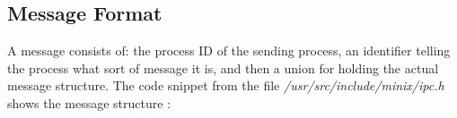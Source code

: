 \subsection{Message Format}

A message consists of: the process ID of the sending process, an identifier telling the process what sort of message it is, and then a union for holding the actual message structure. The code snippet from the file  \emph{/usr/src/include/minix/ipc.h} shows the message structure :

